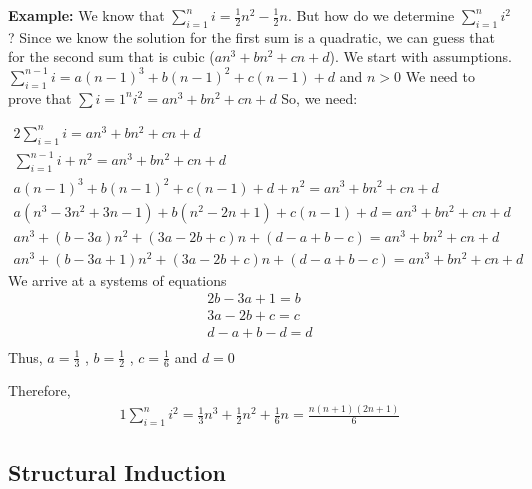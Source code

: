 \documentclass{article}
\begin{document}
\textbf{Example:}
We know that $ \sum_{i=1}^{n} i = \frac{1}{2}n^2 - \frac{1}{2}n$. But how do we determine $ \sum_{i=1}^{n} i^2 $?
Since we know the solution for the first sum is a quadratic, we can guess that for the second sum that is cubic 
($an^3 + bn^2 + cn + d$).
We start with assumptions. $\sum_{i=1}^{n-1} i = a(n-1)^3 + b(n-1)^2 + c(n-1) + d$ and $ n > 0 $
We need to prove that $\sum i = 1^ni^2 = an^3 + bn^2 + cn + d$
So, we need:

\begin{alignat*}{2}
  \sum_{i=1}^{n} i = an^3 + bn^2 + cn + d \\
  \sum_{i=1}^{n-1} i + n^2 = an^3 + bn^2 + cn + d \\
  a(n-1)^3 + b(n-1)^2 + c(n-1) + d + n^2 = an^3 + bn^2 + cn + d \\
  a(n^3-3n^2+3n-1) + b(n^2-2n+1) + c(n-1) + d = an^3 + bn^2 + cn + d \\
  an^3 + (b-3a)n^2 + (3a-2b+c)n + (d-a+b-c) = an^3 + bn^2 + cn + d \\  
  an^3 + (b-3a+1)n^2 + (3a-2b+c)n+(d-a+b-c) = an^3 + bn^2 + cn + d
\end{alignat*}
We arrive at a systems of equations
\begin{alignat*}{2}
  b-3a+1 = b \\
  3a-2b+c = c \\
  d-a+b-d = d \\
\end{alignat*}
Thus, $ a = \frac{1}{3} $ , $ b=\frac{1}{2} $ , $ c=\frac{1}{6} $ and $ d = 0 $

Therefore, 
\begin{alignat*}{1}
  \sum_{i=1}^{n} i^2 = \frac{1}{3}n^3 + \frac{1}{2}n^2 + \frac{1}{6}n = \frac{n(n+1)(2n+1)}{6}
\end{alignat*}

\subsection{Structural Induction}
\end{document}
